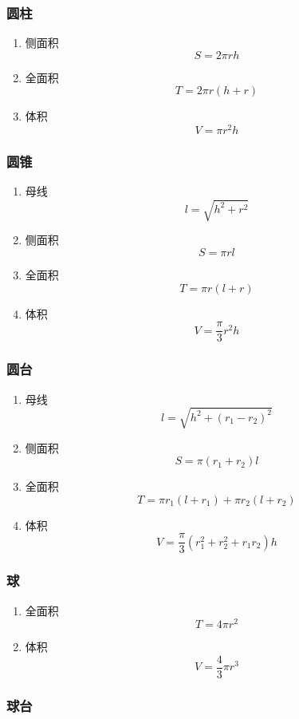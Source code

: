 \documentclass[a4paper]{article}
\begin{document}
\subsubsection{圆柱}

\begin{enumerate}
	\item 侧面积
		$$S=2\pi rh$$
	\item 全面积
		$$T=2\pi r(h+r)$$
	\item 体积
		$$V=\pi r^2h$$
\end{enumerate}

\subsubsection{圆锥}

\begin{enumerate}
	\item 母线
		$$l=\sqrt{h^2+r^2}$$
	\item 侧面积
		$$S=\pi rl$$
	\item 全面积
		$$T=\pi r(l+r)$$
	\item 体积
		$$V=\frac{\pi}{3} r^2h$$
\end{enumerate}

\subsubsection{圆台}

\begin{enumerate}
	\item 母线
		$$l=\sqrt{h^2+(r_1-r_2)^2}$$
	\item 侧面积
		$$S=\pi(r_1+r_2)l$$
	\item 全面积
		$$T=\pi r_1(l+r_1)+\pi r_2(l+r_2)$$
	\item 体积
		$$V=\frac{\pi}{3}(r_1^2+r_2^2+r_1r_2)h$$
\end{enumerate}

\subsubsection{球}

\begin{enumerate}
	\item 全面积
		$$T=4\pi r^2$$
	\item 体积
		$$V=\frac{4}{3}\pi r^3$$
\end{enumerate}

\subsubsection{球台}
\end{document}
